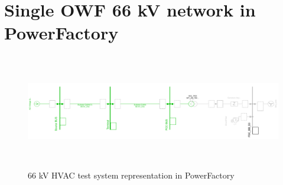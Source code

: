 \section{Single OWF 66 kV network in PowerFactory}
\begin{figure}[H]
\centering
    \includegraphics[height = 5cm,width = 17.5cm]{Diagrams/Appendix_B/WT1_AC_PFD_network_view.pdf}
    \caption{66 kV HVAC test system representation in PowerFactory}
    \label{fig:WT1_AC_PFD_network_view}
\end{figure}

